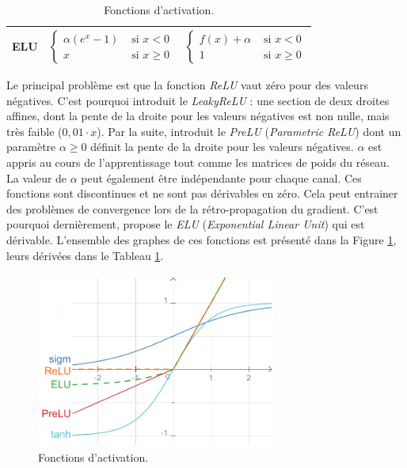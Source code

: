 \begin{table}[]
\begin{tabular}{|l|l|l|}
        ELU       & $\left\{\begin{aligned} \alpha\left(e^{x}-1\right) & \text { si } x<0 \\ x & \text { si } x \geq 0 \end{aligned}\right.$ & $\left\{\begin{aligned} f(x)+\alpha & \text { si } x<0 \\ 1 & \text { si } x \geq 0 \end{aligned}\right.$          \\ \hline
    \end{tabular}
    \caption{Fonctions d'activation.}
    \label{tab:activations}
\end{table}

Le principal problème est que la fonction \textit{ReLU} vaut zéro pour des valeurs négatives.
C'est pourquoi \cite{maas_rectifier_2013} introduit le \textit{LeakyReLU} : une section de deux droites affines, dont la pente de la droite pour les valeurs négatives est non nulle, mais très faible ($0,01 \cdot x$).
Par la suite, \cite{he_delving_2015} introduit le \textit{PreLU} (\textit{Parametric ReLU}) dont un paramètre $\alpha \geq 0$ définit la pente de la droite pour les valeurs négatives.
$\alpha$ est appris au cours de l'apprentissage tout comme les matrices de poids du réseau.
La valeur de $\alpha$ peut également être indépendante pour chaque canal.
Ces fonctions sont discontinues et ne sont pas dérivables en zéro.
Cela peut entrainer des problèmes de convergence lors de la rétro-propagation du gradient.
C'est pourquoi dernièrement, \cite{clevert_fast_2015} propose le \textit{ELU} (\textit{Exponential Linear Unit}) qui est dérivable.
L'ensemble des graphes de ces fonctions est présenté dans la Figure \ref{fig:activation}, leurs dérivées dans le Tableau \ref{tab:activations}.

\begin{figure}[hbtp]
    \centering
    \includegraphics[width=0.7\textwidth,height=0.7\textheight,keepaspectratio]{../Chap3/Figures/activations.pdf}
    \caption{Fonctions d'activation.}
    \label{fig:activation}
\end{figure}

